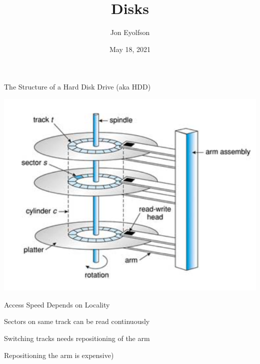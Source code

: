 

\title{Disks}
\author{Jon Eyolfson}
\date{May 18, 2021}


  \begin{frame}
    \titlepage
  \end{frame}

  \begin{frame}{The Structure of a Hard Disk Drive (aka HDD)}
    \begin{center}
        \includegraphics[height=0.8\textheight]{hdd1.png}
    \end{center}
  \end{frame}

  \begin{frame}{Access Speed Depends on Locality}

    Sectors on same track can be read continuously

    \vspace{2em}

    Switching tracks needs repositioning of the arm

    \hspace{2em} Repositioning the arm is expensive)
  \end{frame}

